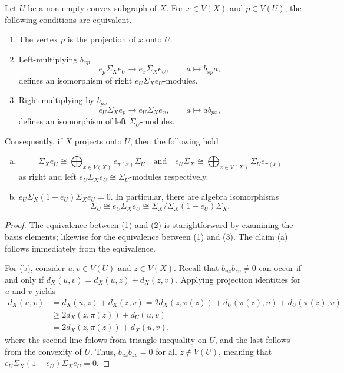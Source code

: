 \documentclass[a4paper,leqno]{amsart}
\begin{document}
\begin{prop}\label{prop:projecting-distance-algebra}
Let $U$ be a non-empty convex subgraph of $X$. 
For $x\in V(X)$ and $p\in V(U)$, the following conditions are
equivalent.
\begin{enumerate}
    \item The vertex $p$ is the projection of $x$ onto $U$.
    \item Left-multiplying $b_{xp}$ 
    \[
    e_p\Sigma_X e_U\longrightarrow e_x\Sigma_Xe_U,
    \qquad a\longmapsto b_{xp}a,
    \]
    defines an isomorphism of right $e_U\Sigma_Xe_U$-modules.
    \item Right-multiplying by $b_{px}$ 
    \[
    e_U\Sigma_X e_p\longrightarrow e_U\Sigma_Xe_x,
    \qquad a\longmapsto ab_{px},
    \]
    defines an isomorphism of left $\Sigma_U$-modules.
\end{enumerate}
Consequently, if $X$ projects onto $U$, then the following hold
\begin{enumerate}[(a)]
\item \[
\Sigma_Xe_U
\cong
\bigoplus_{x\in V(X)}e_{\pi(x)}\Sigma_U
\quad\text{and}\quad 
e_U\Sigma_X
\cong
\bigoplus_{x\in V(X)}\Sigma_Ue_{\pi(x)}
\]
as right and left $e_U\Sigma_Xe_U\cong \Sigma_U$-modules respectively.

\item $e_U\Sigma_X (1-e_U)\Sigma_X e_U=0$.  In particular, there are algebra isomorphisms \[
\Sigma_U \cong e_U \Sigma_X e_U\cong 
\Sigma_X/\Sigma_X(1-e_U)\Sigma_X.\]
\end{enumerate}
\end{prop}
\begin{proof}
The equivalence between (1) and (2) is starightforward by examining the basis elements; likewise for the equivalence between (1) and (3).  The claim (a) follows immediately from the equivalence.

For (b), consider $u,v\in V(U)$ and $z\in V(X)$.
Recall that $b_{uz}b_{zv}\neq 0$ can occur if and only if $d_X(u,v)=d_X(u,z)+d_X(z,v)$.
Applying projection identities for $u$ and $v$ yields
\begin{align*}
d_X(u,v) &= d_X(u,z)+d_X(z,v) = 2d_X(z,\pi(z))+d_U(\pi(z),u)+d_U(\pi(z),v) \\
& \geq 2d_X(z,\pi(z))+d_U(u,v) \\
& = 2d_X(z,\pi(z))+d_X(u,v),
\end{align*} where the second line folows from triangle inequality on $U$, and the last follows from the convexity of $U$.
Thus, $b_{uz}b_{zv}=0$ for all $z\notin V(U)$, meaning that $e_U\Sigma_X(1-e_U)\Sigma_Xe_U=0$.
\end{proof}
\end{document}
